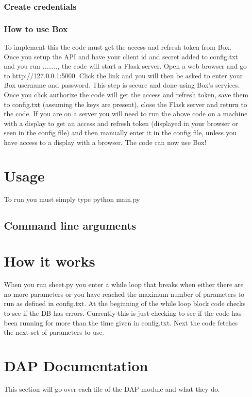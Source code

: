 \documentclass[12pt]{article}
\begin{document}
\subsubsection{Create credentials}


\subsubsection{How to use Box}
To implement this the code must get the access and refresh token from Box.  Once you setup the API and have your client id and secret added to config.txt and you run ........, the code will start a Flask server.  Open a web browser and go to http://127.0.0.1:5000.  Click the link and you will then be asked to enter your Box username and password.  This step is secure and done using Box's services.  Once you click authorize the code will get the access and refresh token, save them to config.txt (assuming the keys are present), close the Flask server and return to the code.  If you are on a server you will need to run the above code on a machine with a display to get an access and refresh token (displayed in your browser or seen in the config file) and then manually enter it in the config file, unless you have access to a display with a browser.  The code can now use Box!\\

\section{Usage}
To run you must simply type python main.py

\subsection{Command line arguments}


\section{How it works}
When you run sheet.py you enter a while loop that breaks when either there are no more parameters or you have reached the maximum number of parameters to run as defined in config.txt.  At the beginning of the while loop block code checks to see if the DB has errors.  Currently this is just checking to see if the code has been running for more than the time given in config.txt.  Next the code fetches the next set of parameters to use.  

\section{DAP Documentation}
This section will go over each file of the DAP module and what they do.\\
\end{document}
